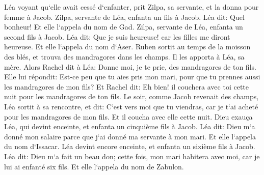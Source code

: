 \verse Léa voyant qu`elle avait cessé d`enfanter, prit Zilpa, sa servante, et la donna pour femme à Jacob. 
\verse Zilpa, servante de Léa, enfanta un fils à Jacob. 
\verse Léa dit: Quel bonheur! Et elle l`appela du nom de Gad. 
\verse Zilpa, servante de Léa, enfanta un second fils à Jacob. 
\verse Léa dit: Que je suis heureuse! car les filles me diront heureuse. Et elle l`appela du nom d`Aser. 
\verse Ruben sortit au temps de la moisson des blés, et trouva des mandragores dans les champs. Il les apporta à Léa, sa mère. Alors Rachel dit à Léa: Donne moi, je te prie, des mandragores de ton fils. 
\verse Elle lui répondit: Est-ce peu que tu aies pris mon mari, pour que tu prennes aussi les mandragores de mon fils? Et Rachel dit: Eh bien! il couchera avec toi cette nuit pour les mandragores de ton fils. 
\verse Le soir, comme Jacob revenait des champs, Léa sortit à sa rencontre, et dit: C`est vers moi que tu viendras, car je t`ai acheté pour les mandragores de mon fils. Et il coucha avec elle cette nuit. 
\verse Dieu exauça Léa, qui devint enceinte, et enfanta un cinquième fils à Jacob. 
\verse Léa dit: Dieu m`a donné mon salaire parce que j`ai donné ma servante à mon mari. Et elle l`appela du nom d`Issacar. 
\verse Léa devint encore enceinte, et enfanta un sixième fils à Jacob. 
\verse Léa dit: Dieu m`a fait un beau don; cette fois, mon mari habitera avec moi, car je lui ai enfanté six fils. Et elle l`appela du nom de Zabulon. 
